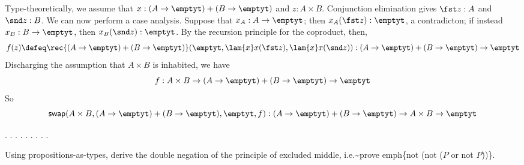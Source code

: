 Type-theoretically, we assume that $x : (A \to\emptyt) + (B \to\emptyt)$ and $z
: A \times B$.  Conjunction elimination gives $\fst z : A$ and $\snd z : B$.
We can now perform a case analysis.  Suppose that $x_{A} : A \to \emptyt$; then
$x_{A}(\fst z) : \emptyt$, a contradicton; if instead $x_{B} : B \to \emptyt$,
then $x_{B}(\snd z) : \emptyt$.  By the recursion principle for the coproduct,
then,
\[
  f(z) \defeq \rec{(A\to\emptyt)+(B\to\emptyt)}(
    \emptyt,
    \lam{x}x(\fst z),
    \lam{x}x(\snd z)
  )
  :
  (A \to \emptyt) + (B \to \emptyt) \to \emptyt
\]
Discharging the assumption that $A \times B$ is inhabited, we have
\[
  f : 
  A \times B \to (A \to \emptyt) + (B \to \emptyt) \to \emptyt
\]
So
\[
  \mathsf{swap}(A\times B, (A\to\emptyt)+(B\to\emptyt), \emptyt, f)
  :
  (A \to \emptyt) + (B \to \emptyt) 
  \to 
  A \times B 
  \to \emptyt
\] \begin{coqdoccode}
\coqdocemptyline
\coqdocnoindent
{} \coqdocnotation{\ensuremath{\lnot}}   \coqdocnotation{\ensuremath{\lnot}}   \coqdocnotation{\ensuremath{\lnot}} \coqdocnotation{(}  \coqdocnotation{)}.\coqdoceol
\coqdocnoindent
{}.\coqdoceol
\coqdocindent{2.00em}
 .\coqdoceol
\coqdocindent{2.00em}
  .\coqdoceol
\coqdocindent{2.00em}
 .\coqdoceol
\coqdocindent{2.00em}
 .\coqdoceol
\coqdocindent{2.00em}
.\coqdoceol
\coqdocindent{2.00em}
 .\coqdoceol
\coqdocnoindent
{}.\coqdoceol
\coqdocemptyline
\coqdocemptyline
\end{coqdoccode}
Using propositions-as-types, derive the double negation of the
principle of excluded middle, i.e.\~{}prove emph\{not (not ($P$ or not $P$))\}. \begin{coqdoccode}
\coqdocemptyline
\coqdocemptyline
\end{coqdoccode}


